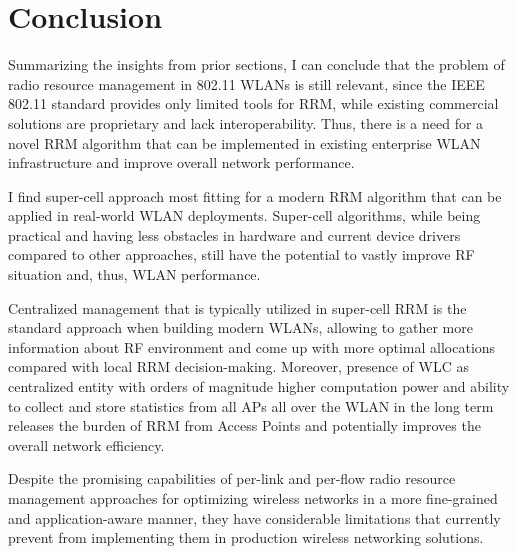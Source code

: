 \section {Conclusion}
\label{chap:lr:sec:conclusion}
Summarizing the insights from prior sections, I can conclude that the problem of radio resource management in 802.11 WLANs is still relevant, since the IEEE 802.11 standard provides only limited tools for RRM, while existing commercial solutions are proprietary and lack interoperability. Thus, there is a need for a novel RRM algorithm that can be implemented in existing enterprise WLAN infrastructure and improve overall network performance.

I find super-cell approach most fitting for a modern RRM algorithm that can be applied in real-world WLAN deployments. Super-cell algorithms, while being practical and having less obstacles in hardware and current device drivers compared to other approaches, still have the potential to vastly improve RF situation and, thus, WLAN performance.

Centralized management that is typically utilized in super-cell RRM is the standard approach when building modern WLANs, allowing to gather more information about RF environment and come up with more optimal allocations compared with local RRM decision-making.
Moreover, presence of WLC as centralized entity with orders of magnitude higher computation power and ability to collect and store statistics from all APs all over the WLAN in the long term releases the burden of RRM from Access Points and potentially improves the overall network efficiency.

Despite the promising capabilities of per-link and per-flow radio resource management approaches for optimizing wireless networks in a more fine-grained and application-aware manner, they have considerable limitations that currently prevent from implementing them in production wireless networking solutions.

